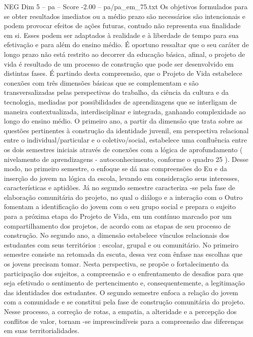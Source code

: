 \begin{textsample}{NEG Dim 5 – pa – Score -2.00 – pa/pa\_em\_75.txt}
Os objetivos formulados para se obter resultados imediatos ou a médio prazo são necessários são intencionais e podem provocar efeitos de ações futuras, contudo não representa sua finalidade em si.
Esses podem ser adaptados à realidade e à liberdade de tempo para sua efetivação e para além do ensino médio.
É oportuno ressaltar que o seu caráter de longo prazo não está restrito ao decorrer da educação básica, afinal, o projeto de vida é resultado de um processo de construção que pode ser desenvolvido em distintas fases.
É partindo desta compreensão, que o Projeto de Vida estabelece conexões com três dimensões básicas que se complementam e são transversalizadas pelas perspectivas do trabalho, da ciência da cultura e da tecnologia, mediadas por possibilidades de aprendizagens que se interligam de maneira contextualizada, interdisciplinar e integrada, ganhando complexidade ao longo do ensino médio.
O primeiro ano, a partir da dimensão que trata sobre as questões pertinentes à construção da identidade juvenil, em perspectiva relacional entre o individual/particular e o coletivo/social, estabelece uma confluência entre os dois semestres iniciais através de conexões com a lógica de aprofundamento ( nivelamento de aprendizagens - autoconhecimento, conforme o quadro 25 ).
Desse modo, no primeiro semestre, o enfoque se dá nas compreensões do Eu e da inserção do jovem na lógica da escola, levando em consideração seus interesses, características e aptidões.
Já no segundo semestre caracteriza -se pela fase de elaboração comunitária do projeto, no qual o diálogo e a interação com o Outro fomentam a identificação do jovem com o seu grupo social e prepara o sujeito para a próxima etapa do Projeto de Vida, em um contínuo marcado por um compartilhamento dos projetos, de acordo com as etapas de seu processo de construção.
No segundo ano, a dimensão estabelece vínculos relacionais dos estudantes com seus territórios : escolar, grupal e ou comunitário.
No primeiro semestre consiste na retomada da escuta, dessa vez com ênfase nas escolhas que os jovens precisam tomar.
Nesta perspectiva, se propõe o fortalecimento da participação dos sujeitos, a compreensão e o enfrentamento de desafios para que seja efetivado o sentimento de pertencimento e, consequentemente, a legitimação das identidades dos estudantes.
O segundo semestre enfoca a relação do jovem com a comunidade e se constitui pela fase de construção comunitária do projeto.
Nesse processo, a correção de rotas, a empatia, a alteridade e a percepção dos conflitos de valor, tornam -se imprescindíveis para a compreensão das diferenças em suas territorialidades.

\end{textsample}
